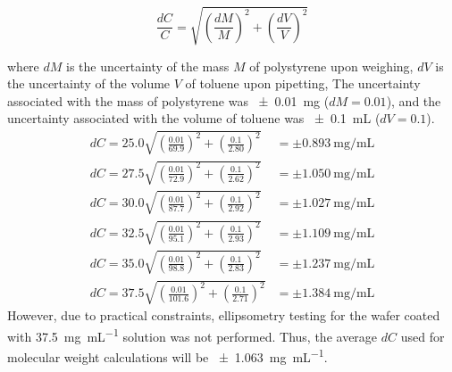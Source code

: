 \documentclass[twocolumn]{article}
\begin{document}
                    \begin{equation}
                        \frac{dC}{C} = \sqrt{(\frac{dM}{M})^2 + (\frac{dV}{V})^2}
                    \end{equation}
                    
                    where $dM$ is the uncertainty of the mass $M$ of polystyrene upon weighing, $dV$ is the uncertainty of the volume $V$ of toluene upon pipetting, The uncertainty associated with the mass of polystyrene was \qty{\pm 0.01}{\milli\gram} ($dM = 0.01$), and the uncertainty associated with the volume of toluene was \qty{\pm 0.1}{\milli\liter} ($dV = 0.1$). 
                    \begin{align}
                        dC = 25.0\sqrt{(\frac{0.01}{69.9})^2 + (\frac{0.1}{2.80})^2} &= \pm \qty{0.893}{\milli\gram\per\milli\liter}\\
                        dC = 27.5\sqrt{(\frac{0.01}{72.9})^2 + (\frac{0.1}{2.62})^2} &= \pm \qty{1.050}{\milli\gram\per\milli\liter}\\
                        dC = 30.0\sqrt{(\frac{0.01}{87.7})^2 + (\frac{0.1}{2.92})^2} &= \pm \qty{1.027}{\milli\gram\per\milli\liter}\\
                        dC = 32.5\sqrt{(\frac{0.01}{95.1})^2 + (\frac{0.1}{2.93})^2} &= \pm \qty{1.109}{\milli\gram\per\milli\liter}\\
                        dC = 35.0\sqrt{(\frac{0.01}{98.8})^2 + (\frac{0.1}{2.83})^2} &= \pm \qty{1.237}{\milli\gram\per\milli\liter}\\
                        dC = 37.5\sqrt{(\frac{0.01}{101.6})^2 + (\frac{0.1}{2.71})^2} &= \pm \qty{1.384}{\milli\gram\per\milli\liter}
                    \end{align}
                    However, due to practical constraints, ellipsometry testing for the wafer coated with \qty{37.5}{\milli\gram\per\milli\liter} solution was not performed. Thus, the average $dC$ used for molecular weight calculations will be \qty{\pm 1.063}{\milli\gram\per\milli\liter}.
\end{document}
